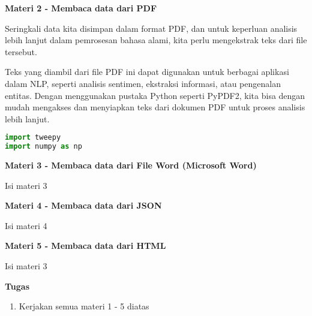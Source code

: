 \documentclass{article}
\begin{document}
    \begin{flushleft}
        \textbf{Materi 2 - Membaca data dari PDF}
        \newline

        Seringkali data kita disimpan dalam format PDF, dan untuk keperluan analisis lebih 
        lanjut dalam pemrosesan bahasa alami, kita perlu mengekstrak teks dari file tersebut. \newline

        Teks yang diambil dari file PDF ini dapat digunakan untuk berbagai aplikasi dalam 
        NLP, seperti analisis sentimen, ekstraksi informasi, atau pengenalan entitas. 
        Dengan menggunakan pustaka Python seperti PyPDF2, kita bisa dengan mudah mengakses 
        dan menyiapkan teks dari dokumen PDF untuk proses analisis lebih lanjut. \newline

        \lstset{style=pythonstyle}
            \begin{lstlisting}[language=python]
import tweepy
import numpy as np

            \end{lstlisting}
        \lstset{style=pythonstyle}


    \end{flushleft}

    \begin{flushleft}
        \textbf{Materi 3 - Membaca data dari File Word (Microsoft Word)}
        \newline

        Isi materi 3
    \end{flushleft}

    \begin{flushleft}
        \textbf{Materi 4 - Membaca data dari JSON}
        \newline

        Isi materi 4
    \end{flushleft}

    \begin{flushleft}
        \textbf{Materi 5 - Membaca data dari HTML}
        \newline

        Isi materi 3
    \end{flushleft}

    \newpage
    \begin{flushleft}
        \textbf{Tugas}
        \newline

        \begin{enumerate}
            \item Kerjakan semua materi 1 - 5 diatas
        \end{enumerate}
    \end{flushleft}
\end{document}

